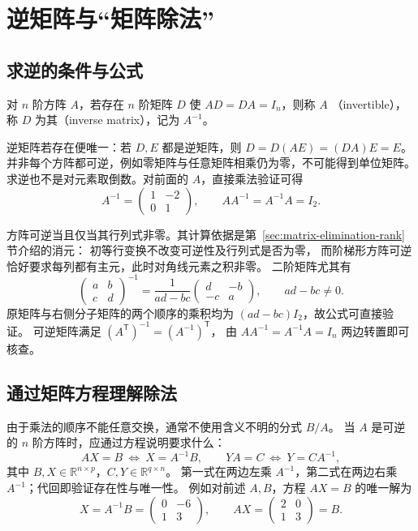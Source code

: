 \documentclass[UTF8,12pt,a4paper,fontset=fandol]{ctexart}
\begin{document}
\section{逆矩阵与“矩阵除法”}

\subsection{求逆的条件与公式}

\begin{definition}[逆矩阵]
对 $n$ 阶方阵 $A$，若存在 $n$ 阶矩阵 $D$ 使 $AD=DA=I_n$，则称 $A$
（invertible），称 $D$ 为其（inverse matrix），记为 $A^{-1}$。
\end{definition}

逆矩阵若存在便唯一：若 $D,E$ 都是逆矩阵，则 $D=D(AE)=(DA)E=E$。
并非每个方阵都可逆，例如零矩阵与任意矩阵相乘仍为零，不可能得到单位矩阵。
求逆也不是对元素取倒数。对前面的 $A$，直接乘法验证可得
\[
  A^{-1}=\begin{pmatrix}1&-2\\0&1\end{pmatrix},\qquad
  AA^{-1}=A^{-1}A=I_2.
\]

方阵可逆当且仅当其行列式非零。其计算依据是第~\ref{sec:matrix-elimination-rank} 节介绍的消元：
初等行变换不改变可逆性及行列式是否为零，
而阶梯形方阵可逆恰好要求每列都有主元，此时对角线元素之积非零。
二阶矩阵尤其有
\begin{equation}
  \begin{pmatrix}a&b\\c&d\end{pmatrix}^{-1}
  =\frac{1}{ad-bc}\begin{pmatrix}d&-b\\-c&a\end{pmatrix},
  \qquad ad-bc\ne0.
  \label{eq:matrix-inverse-two-by-two}
\end{equation}
原矩阵与右侧分子矩阵的两个顺序的乘积均为 $(ad-bc)I_2$，故公式可直接验证。
可逆矩阵满足 $(A^{\mathsf T})^{-1}=(A^{-1})^{\mathsf T}$，
由 $AA^{-1}=A^{-1}A=I_n$ 两边转置即可核查。

\subsection{通过矩阵方程理解除法}

由于乘法的顺序不能任意交换，通常不使用含义不明的分式 $B/A$。
当 $A$ 是可逆的 $n$ 阶方阵时，应通过方程说明要求什么：
\begin{equation}
  AX=B\ \Longleftrightarrow\ X=A^{-1}B,\qquad
  YA=C\ \Longleftrightarrow\ Y=CA^{-1},
  \label{eq:matrix-equations-inverse}
\end{equation}
其中 $B,X\in\mathbb R^{n\times p}$，$C,Y\in\mathbb R^{q\times n}$。
第一式在两边左乘 $A^{-1}$，第二式在两边右乘 $A^{-1}$；代回即验证存在性与唯一性。
例如对前述 $A,B$，方程 $AX=B$ 的唯一解为
\[
  X=A^{-1}B=\begin{pmatrix}0&-6\\1&3\end{pmatrix},\qquad
  AX=\begin{pmatrix}2&0\\1&3\end{pmatrix}=B.
\]
\end{document}
